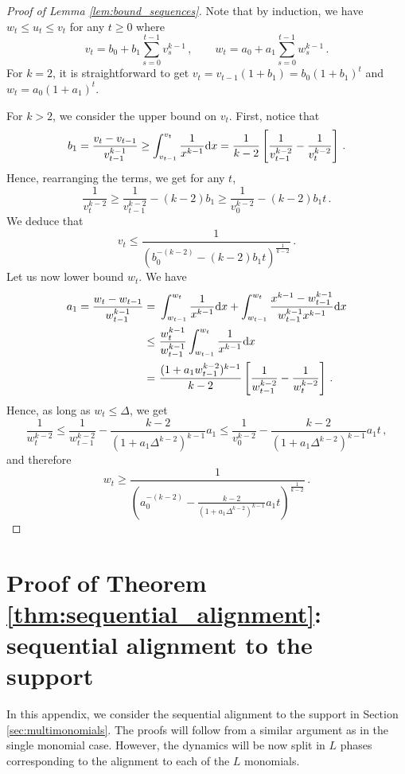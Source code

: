 \documentclass[11pt]{article}
\newcommand{\<}{\langle}
\renewcommand{\>}{\rangle}
\theoremstyle{definition}
\def\de{{\rm d}}
\def\de{{\rm d}}
\def\de{{\rm d}}
\begin{document}
\begin{proof}[Proof of Lemma \ref{lem:bound_sequences}] Note that by induction, we have $w_t \leq u_t \leq v_t$ for any $t \geq 0$ where
\[
v_t = b_0 + b_1 \sum_{s = 0}^{t-1} v_s^{k-1} \, , \qquad w_t = a_0 + a_1 \sum_{s = 0}^{t-1} w_s^{k-1} \, .
\]
For $k = 2$, it is straightforward to get $v_t = v_{t-1} (1 + b_1) = b_0 (1 + b_1)^t$ and $w_t = a_0 (1 + a_1 )^t$. 

For $k > 2$, we consider the upper bound on $v_t$. First, notice that
\[
b_1 = \frac{v_t - v_{t-1}}{v_{t-1}^{k-1}} \geq \int_{v_{t-1}}^{v_t} \frac{1}{x^{k-1} } \de x = \frac{1}{k-2} \left[ \frac{1}{v_{t-1}^{k-2}} - \frac{1}{v_t^{k-2}} \right] \, .
\]
Hence, rearranging the terms, we get for any $t$,
\[
\frac{1}{v_t^{k-2}} \geq \frac{1}{v_{t-1}^{k-2}} - (k-2) b_1 \geq  \frac{1}{v_{0}^{k-2}}  - (k-2)b_1 t \, .
\]
We deduce that
\[
v_t \leq \frac{1}{\left(b_0^{-(k-2)} -  (k-2) b_1  t \right)^{\frac{1}{k-2}}}\, .
\]
Let us now lower bound $w_t$. We have
\[
\begin{aligned}
a_1 = \frac{w_t - w_{t-1}}{w_{t-1}^{k-1}} =&~  \int_{w_{t-1}}^{w_t} \frac{1}{x^{k-1} } \de x + \int_{w_{t-1}}^{w_t} \frac{x^{k-1} - w_{t-1}^{k-1}}{w_{t-1}^{k-1} x^{k-1} } \de x   \\
\leq&~   \frac{w_{t}^{k-1} }{ w_{t-1}^{k-1}} \int_{w_{t-1}}^{w_t} \frac{1}{x^{k-1} } \de x  \\
=&~  \frac{(1 + a_1 w_{t-1}^{k-2} )^{k-1} }{k-2} \left[ \frac{1}{w_{t-1}^{k-2}} - \frac{1}{w_t^{k-2}} \right] \, .
\end{aligned}
\]
Hence, as long as $w_t \leq \Delta$, we get
\[
\frac{1}{w_t^{k-2}} \leq \frac{1}{w_{t-1}^{k-2}} - \frac{k-2}{(1 + a_1 \Delta^{k-2} )^{k-1}}  a_1 \leq  \frac{1}{v_{0}^{k-2}}  - \frac{k-2}{(1 + a_1 \Delta^{k-2} )^{k-1}} a_1 t \, ,
\]
and therefore
\[
w_t \geq \frac{1}{\left(a_0^{-(k-2)} - \frac{k-2}{(1 +a_1 \Delta^{k-2} )^{k-1}} a_1 t \right)^{\frac{1}{k-2}}} \, .
\]
\end{proof}




\clearpage




\section{Proof of Theorem \ref{thm:sequential_alignment}: sequential alignment to the support}
\label{sec:proof_alignment_several_monomials}

In this appendix, we consider the sequential alignment to the support in Section \ref{sec:multimonomials}. The proofs will follow from a similar argument as in the single monomial case. However, the dynamics will be now split in $L$ phases corresponding to the alignment to each of the $L$ monomials. 
\end{document}
